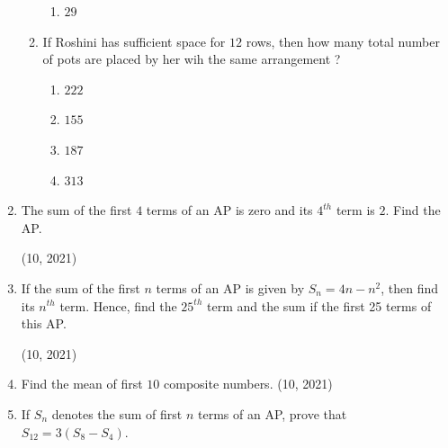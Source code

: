 \begin{enumerate}[label=\thesubsection.\arabic*,ref=\thesubsection.\theenumi,itemsep=1pt]
\begin{enumerate}
\begin{multicols}{4}
\begin{enumerate}
					 \item $29$
				\end{enumerate}
\end{multicols}
			 \item If Roshini has sufficient space for $12$ rows, then how many total number of pots are placed by her wih the same arrangement ?
				\begin{multicols}{4}
\begin{enumerate}    
					 \item $222$
					 \item $155$
					 \item $187$
					 \item $313$
				\end{enumerate}
\end{multicols}
		\end{enumerate} 
	 \item The sum of the first $4$ terms of an AP is zero and its $4^{th}$ term is $2$. Find the AP.

	\hfill (10, 2021) \item If the sum of the first $n$ terms of an AP is given by $S_n = 4n - n^2$, then find its $n^{th}$ term. Hence, find the $25^{th}$ term and the sum if the first 25 terms of this AP.

\hfill (10, 2021)
	 \item Find the mean of first $10$ composite numbers.
	\hfill (10, 2021) \item If $S_n$ denotes the sum of first $n$ terms of an AP, prove that $S_{12} = 3(S_8 - S_4)$.


\end{enumerate}
